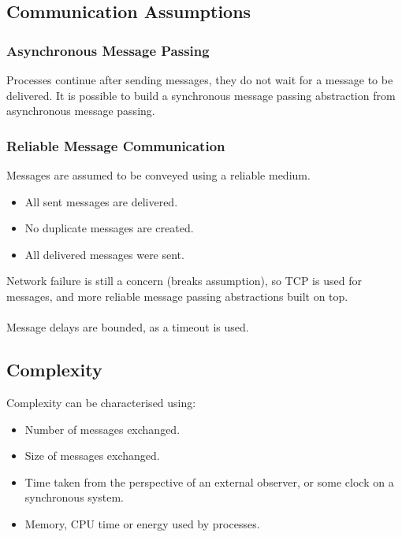 \subsection{Communication Assumptions}
\subsubsection{Asynchronous Message Passing}
Processes continue after sending messages, they do not wait for a message to be delivered. It is possible to build a synchronous message passing abstraction from asynchronous message passing.

\subsubsection{Reliable Message Communication}
Messages are assumed to be conveyed using a reliable medium.
\begin{itemize}
    \item All sent messages are delivered.
    \item No duplicate messages are created.
    \item All delivered messages were sent.
\end{itemize}
\noindent
Network failure is still a concern (breaks assumption), so TCP is used for messages, and more reliable message passing abstractions built on top.
\\
\\ Message delays are bounded, as a timeout is used.

\subsection{Complexity}
Complexity can be characterised using:
\begin{itemize}
    \item Number of messages exchanged.
    \item Size of messages exchanged.
    \item Time taken from the perspective of an external observer, or some clock on a synchronous system.
    \item Memory, CPU time or energy used by processes.
\end{itemize}

